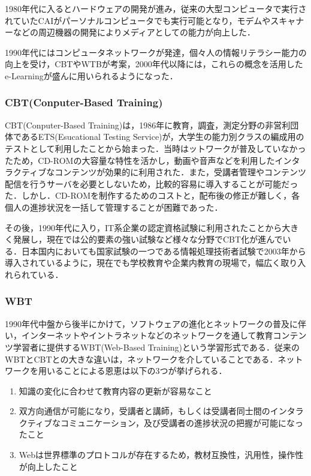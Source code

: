 \documentclass[a4j,12pt]{jsarticle}
\begin{document}
1980年代に入るとハードウェアの開発が進み，従来の大型コンピュータで実行されていたCAIがパーソナルコンピュータでも実行可能となり，モデムやスキャナーなどの周辺機器の開発によりメディアとしての能力が向上した．

1990年代にはコンピュータネットワークが発達，個々人の情報リテラシー能力の向上を受け，CBTやWTBが考案，2000年代以降には，これらの概念を活用したe-Learningが盛んに用いられるようになった．

\subsubsection{CBT(Conputer-Based Training)}
CBT(Conputer-Based Training)は，1986年に教育，調査，測定分野の非営利団体であるETS(Esucational Testing Service)が，大学生の能力別クラスの編成用のテストとして利用したことから始まった．当時はットワークが普及していなかったため，CD-ROMの大容量な特性を活かし，動画や音声などを利用したインタラクティブなコンテンツが効果的に利用された．また，受講者管理やコンテンツ配信を行うサーバを必要としないため，比較的容易に導入することが可能だった．しかし．CD-ROMを制作するためのコストと，配布後の修正が難しく，各個人の進捗状況を一括して管理することが困難であった．

その後，1990年代に入り，IT系企業の認定資格試験に利用されたことから大きく発展し，現在では公的要素の強い試験など様々な分野でCBT化が進んでいる．日本国内においても国家試験の一つである情報処理技術者試験で2003年から導入されているように，現在でも学校教育や企業内教育の現場で，幅広く取り入れられている．

\subsubsection{WBT}
1990年代中盤から後半にかけて，ソフトウェアの進化とネットワークの普及に伴い，インターネットやイントラネットなどのネットワークを通して教育コンテンツ学習者に提供するWBT(Web-Based Training)という学習形式である．従来のWBTとCBTとの大きな違いは，ネットワークを介していることである．ネットワークを用いることによる恩恵は以下の3つが挙げられる．

\begin{enumerate}
\item 知識の変化に合わせて教育内容の更新が容易なこと
\item 双方向通信が可能になり，受講者と講師，もしくは受講者同士間のインタラクティブなコミュニケーション，及び受講者の進捗状況の把握が可能になったこと
\item Webは世界標準のプロトコルが存在するため，教材互換性，汎用性，操作性が向上したこと
\end{enumerate}
\end{document}
